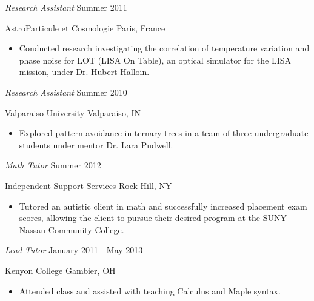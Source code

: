 \documentclass[11pt,article,oneside]{memoir}
\begin{document}
\ind \emph{Research Assistant} \hfill {\small Summer 2011}

\ind AstroParticule et Cosmologie \hfill {\small Paris, France}
\small
\begin{itemize}
  \item Conducted research investigating the correlation of temperature
    variation and phase noise for LOT (LISA On Table), an optical simulator for
    the LISA mission, under Dr. Hubert Halloin.
\end{itemize}
\normalsize

\ind \emph{Research Assistant} \hfill {\small Summer 2010}

\ind Valparaiso University \hfill {\small Valparaiso, IN}
\small
\begin{itemize}
  \item Explored pattern avoidance in ternary trees in a team of three
    undergraduate students under mentor Dr. Lara Pudwell.
\end{itemize}
\normalsize

\bigskip


\ind \emph{Math Tutor} \hfill {\small Summer 2012}

\ind Independent Support Services \hfill {\small Rock Hill, NY}
\small
\begin{itemize}
  \item Tutored an autistic client in math and successfully increased placement
    exam scores, allowing the client to pursue their desired program at the
    SUNY Nassau Community College.
\end{itemize}
\normalsize

\ind \emph{Lead Tutor} \hfill {\small January 2011 - May 2013}

\ind Kenyon College \hfill {\small Gambier, OH}
\small
\begin{itemize}
  \item Attended class and assisted with teaching Calculus and Maple syntax.
\end{itemize}
\normalsize

\bigskip


\end{document}

